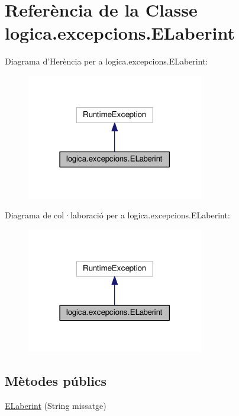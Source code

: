 \hypertarget{classlogica_1_1excepcions_1_1_e_laberint}{\section{Referència de la Classe logica.\+excepcions.\+E\+Laberint}
\label{classlogica_1_1excepcions_1_1_e_laberint}
}


Diagrama d'Herència per a logica.\+excepcions.\+E\+Laberint\+:\nopagebreak
\begin{figure}[H]
\begin{center}
\leavevmode
\includegraphics[width=219pt]{classlogica_1_1excepcions_1_1_e_laberint__inherit__graph}
\end{center}
\end{figure}


Diagrama de col·laboració per a logica.\+excepcions.\+E\+Laberint\+:\nopagebreak
\begin{figure}[H]
\begin{center}
\leavevmode
\includegraphics[width=219pt]{classlogica_1_1excepcions_1_1_e_laberint__coll__graph}
\end{center}
\end{figure}
\subsection*{Mètodes públics}
\begin{DoxyCompactItemize}
\item 
\hyperlink{classlogica_1_1excepcions_1_1_e_laberint_a351544cabefcda88ba9b90f035542f91}{E\+Laberint} (String missatge)
\end{DoxyCompactItemize}


